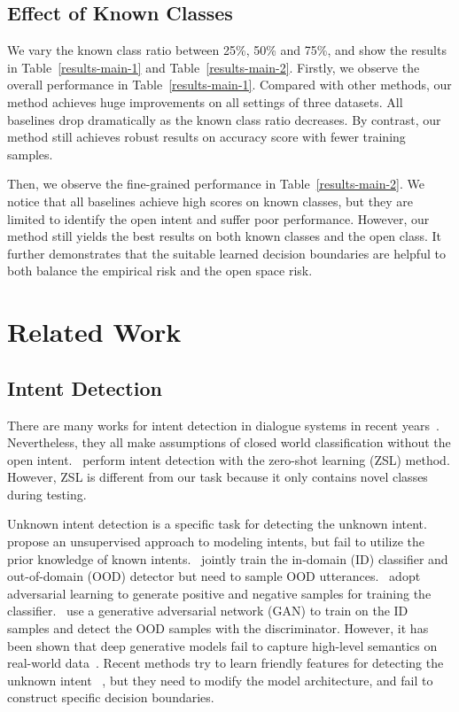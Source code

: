 \documentclass[letterpaper]{article} %
\begin{document}
\vspace{-2.16mm}
\subsection{Effect of Known Classes}
We vary the known class ratio between 25\%, 50\% and 75\%, and show the results in Table~\ref{results-main-1} and Table~\ref{results-main-2}. Firstly, we observe the overall performance in Table~\ref{results-main-1}. Compared with other methods, our method achieves huge improvements on all settings of three datasets. All baselines drop dramatically as the known class ratio decreases. By contrast, our method still achieves robust results on accuracy score with fewer training samples.

Then, we observe the fine-grained performance in Table~\ref{results-main-2}. We notice that all baselines achieve high scores on known classes, but they are limited to identify the open intent and suffer poor performance. However, our method still yields the best results on both known classes and the open class. It further demonstrates that the suitable learned decision boundaries are helpful to both balance the empirical risk and the open space risk.

\vspace{-1.13mm}
\vspace{-2.03mm}
\section{Related Work}
\subsection{Intent Detection}
There are many works for intent detection in dialogue systems in recent years~\cite{ijcai2020-532,Qin_Che_Li_Ni_Liu_2020,zhang-etal-2019-joint,e-etal-2019-novel,qin-etal-2019-stack}. Nevertheless, they all make assumptions of closed world classification without the open intent.~\citet{srivastava-etal-2018-zero} perform intent detection with the zero-shot learning (ZSL) method. However, ZSL is different from our task because it only contains novel classes during testing.

Unknown intent detection is a specific task for detecting the unknown intent.~\citet{Brychcin2017UnsupervisedDA} propose an unsupervised approach to modeling intents,  but fail to utilize the prior knowledge of known intents.~\citet{Kim2018JointLO} jointly train the in-domain (ID) classifier and out-of-domain (OOD) detector but need to sample OOD utterances.~\citet{Yu2017OpenCategoryCB} adopt adversarial learning to generate positive and negative samples for training the classifier.~\citet{ryu-etal-2018-domain} use a generative adversarial network (GAN) to train on the ID samples and detect the OOD samples with the discriminator. However, it has been shown that deep generative models fail to capture high-level semantics on real-world data~\cite{2018arXiv181009136N,Mundt_2019_ICCV}. Recent methods try to learn friendly features for detecting the unknown intent ~\cite{lin-xu-2019-deep,gangal2020likelihood,yan-etal-2020-unknown}, but they need to modify the  model architecture, and fail to construct specific decision boundaries.
\end{document}
